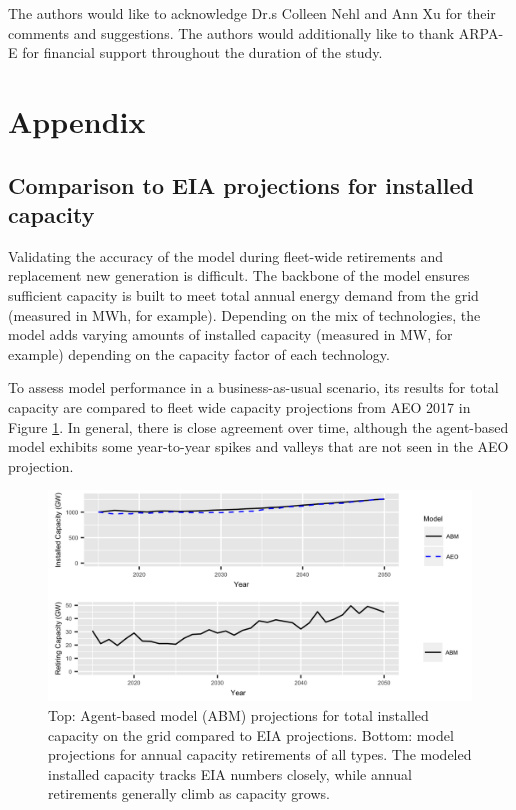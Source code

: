 \documentclass[review]{elsarticle}
\begin{document}
The authors would like to acknowledge Dr.s Colleen Nehl and Ann Xu for their comments and suggestions. The authors would additionally like to thank ARPA-E for financial support throughout the duration of the study. 


\section{Appendix}


\subsection{Comparison to EIA projections for installed capacity}

Validating the accuracy of the model during fleet-wide retirements and replacement new generation is difficult. The backbone of the model ensures sufficient capacity is built to meet total annual energy demand from the grid (measured in MWh, for example). Depending on the mix of technologies, the model adds varying amounts of installed capacity (measured in MW, for example) depending on the capacity factor of each technology.

To assess model performance in a business-as-usual scenario, its results for total capacity are compared to fleet wide capacity projections from AEO 2017 \citep{NEMS2014}  in Figure \ref{fig:EIA_comparison}. In general, there is close agreement over time, although the agent-based model exhibits some year-to-year spikes and valleys that are not seen in the AEO projection.

\begin{figure}[!htp]
\begin{center}
\includegraphics[width=\textwidth]{Fig4_1.png}
\end{center}
\caption{Top: Agent-based model (ABM) projections for total installed capacity on the grid compared to EIA projections. Bottom: model projections for annual capacity retirements of all types. The modeled installed capacity tracks EIA numbers closely, while annual retirements generally climb as capacity grows.}
\label{fig:EIA_comparison}
\end{figure}
\end{document}
